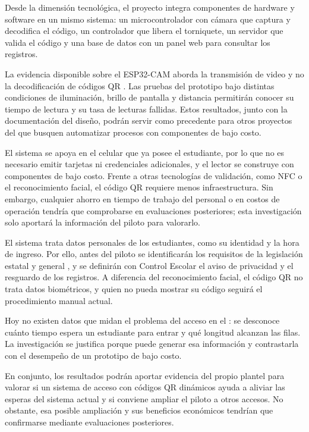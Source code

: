 Desde la dimensión tecnológica, el proyecto integra componentes de hardware
y software en un mismo sistema: un microcontrolador con cámara que captura y
decodifica el código, un controlador que libera el torniquete, un servidor
que valida el código y una base de datos con un panel web para consultar los
registros.

La evidencia disponible sobre el ESP32-CAM aborda la transmisión de video y
no la decodificación de códigos QR \parencite{nowroz2025esp32cam}. Las
pruebas del prototipo bajo distintas condiciones de iluminación, brillo de
pantalla y distancia permitirán conocer su tiempo de lectura y su tasa de
lecturas fallidas. Estos resultados, junto con la documentación del diseño,
podrán servir como precedente para otros proyectos del \tescha{} que
busquen automatizar procesos con componentes de bajo costo.

El sistema se apoya en el celular que ya posee el estudiante, por lo que no
es necesario emitir tarjetas ni credenciales adicionales, y el lector se
construye con componentes de bajo costo. Frente a otras tecnologías de
validación, como NFC o el reconocimiento facial, el código QR requiere menos
infraestructura. Sin embargo, cualquier ahorro en tiempo de trabajo del
personal o en costos de operación tendría que comprobarse en evaluaciones
posteriores; esta investigación solo aportará la información del piloto para
valorarlo.

El sistema trata datos personales de los estudiantes, como su identidad y
la hora de ingreso. Por ello, antes del piloto se identificarán los
requisitos de la legislación estatal \parencite{edomex2017datos} y general
\parencite{lgpdppso2025}, y se definirán con Control Escolar el aviso de
privacidad y el resguardo de los registros. A diferencia del reconocimiento
facial, el código QR no trata datos biométricos, y quien no pueda mostrar su
código seguirá el procedimiento manual actual.

\ifdefined\solojustificacion

\fi

Hoy no existen datos que midan el problema del acceso en el \tescha{}: se
desconoce cuánto tiempo espera un estudiante para entrar y qué longitud
alcanzan las filas. La investigación se justifica porque puede generar esa
información y contrastarla con el desempeño de un prototipo de bajo costo.

En conjunto, los resultados podrán aportar evidencia del propio plantel para
valorar si un sistema de acceso con códigos QR dinámicos ayuda a aliviar
las esperas del sistema actual y si conviene ampliar el piloto a otros
accesos. No obstante, esa posible ampliación y sus beneficios económicos
tendrían que confirmarse mediante evaluaciones posteriores.

